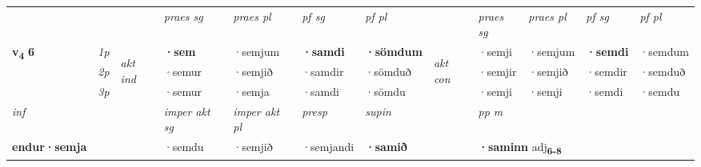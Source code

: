 \begin{longtable}[l]{X>{\footnotesize\itshape}llXXXXlXXXX}
\midrule

 & &   & \textit{praes sg}  & \textit{praes pl}    & \textit{ pf sg} & \textit{pf pl} & & \textit{praes sg}  & \textit{praes pl}    & \textit{pf sg} & \textit{pf pl }  \\ \cmidrule{4-7} \cmidrule{9-12}
 \multirow{2}{*}{{{\textbf{v{\textsubscript{4}}} \Large{\textbf{6}}}}}  & 1p & \multirow{3}{*}{\begin{turn}{90}\textit{akt ind}\end{turn}} & \textbf{·sem} & ·semjum & \textbf{·samdi} & \textbf{·sömdum} & \multirow{3}{*}{\begin{turn}{90}\textit{akt con}\end{turn}} &·semji & ·semjum & \textbf{·semdi} & ·semdum\\*
 & 2p &  &  ·semur  & ·semjið & ·samdir & ·sömduð & & ·semjir & ·semjið & ·semdir & ·semduð \\*
 & 3p &  & ·semur & ·semja & ·samdi & ·sömdu & & ·semji & ·semji& ·semdi & ·semdu \\*
\cmidrule{4-7} \cmidrule{9-12}

   {\textit{inf}} & &  & \textit{imper akt sg} & \textit{imper akt pl}   & \textit{presp} & \textit{supin}  && \textit{pp m} \\*
  {\textbf{endur\allowbreak ·semja}} & && ·semdu  & ·semjið   & ·semjandi &  \textbf{·samið}  && \multicolumn{2}{l}{\textbf{·saminn} adj\textbf{\textsubscript{6-8}}} \\*

\midrule


\end{longtable}
